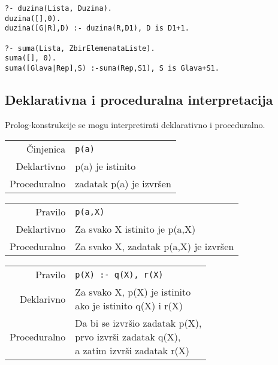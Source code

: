 \documentclass[../main.tex]{subfiles}
\begin{document}
\begin{boxprimer}[width=\linewidth/3*2]
\begin{Verbatim}
?- duzina(Lista, Duzina).
duzina([],0).
duzina([G|R],D) :- duzina(R,D1), D is D1+1.

?- suma(Lista, ZbirElemenataListe).
suma([], 0).
suma([Glava|Rep],S) :-suma(Rep,S1), S is Glava+S1.
\end{Verbatim}
\end{boxprimer}

\subsection{Deklarativna i proceduralna interpretacija}

Prolog-konstrukcije se mogu interpretirati deklarativno i proceduralno.

\begin{multicols}{2}

\begin{boxprimer}
\begin{tabular}{rl}
Činjenica & \texttt{p(a)} \\
Deklartivno & p(a) je istinito \\
Proceduralno& zadatak p(a) je izvršen
\end{tabular}
\end{boxprimer}

\begin{boxprimer}
\begin{tabular}{rl}
Pravilo & \texttt{p(a,X)}\\
Deklartivno& Za svako X istinito je p(a,X)\\
Proceduralno& Za svako X, zadatak p(a,X) je izvršen
\end{tabular}
\end{boxprimer}

\begin{boxprimer}
\begin{tabular}{rl}
Pravilo& \texttt{p(X) :- q(X), r(X)}\\
Deklarivno&\makecell[l]{ Za svako X, p(X) je istinito \\ ako je istinito q(X) i r(X)}\\
Proceduralno&\makecell[l]{ Da bi se izvršio zadatak p(X), \\prvo izvrši zadatak q(X), \\a zatim izvrši zadatak r(X) }
\end{tabular}
\end{boxprimer}

\end{multicols}
\end{document}
